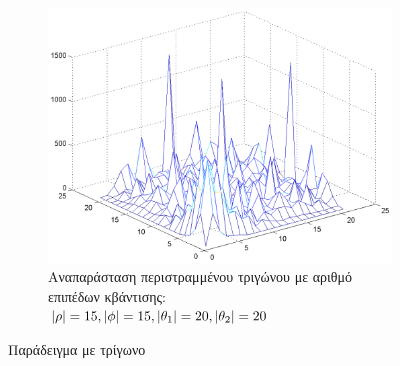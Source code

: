 \begin{figure}
\ContinuedFloat
        \centering
        \begin{subfigure}[b]{1\textwidth}
                \centerline{\includegraphics[scale = 0.3]{./images/examples/Rotatedtrigwno(15152020).png}}
                \caption{Αναπαράσταση περιστραμμένου τριγώνου με αριθμό επιπέδων κβάντισης: $\lvert\rho\rvert = 15,\lvert\phi\rvert = 15,\lvert\theta_1\rvert = 20,\lvert\theta_2\rvert = 20$}
        \end{subfigure}%
        \caption{Παράδειγμα με τρίγωνο}
\end{figure}

